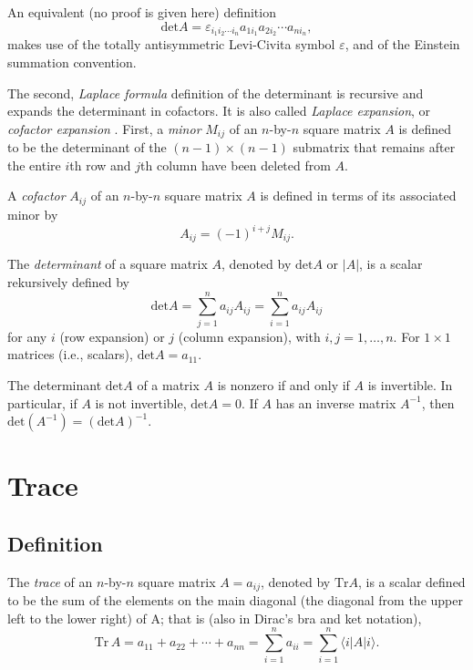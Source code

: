 An equivalent (no proof is given here) definition
\begin{equation}
\textrm{det}A
=\varepsilon_{i_1 i_2\cdots i_n} a_{1i_1}a_{2i_2} \cdots a_{ni_n},
\end{equation}
makes use of the  totally antisymmetric Levi-Civita symbol $\varepsilon$,
 and  of the
 Einstein summation convention.


The second,
{\em Laplace formula}
definition of the determinant
is recursive and expands the determinant in cofactors.
It is also called
{\em Laplace expansion},
or
{\em cofactor expansion}
.
First,
a {\em minor}
$M_{ij}$ of an  $n$-by-$n$ square matrix  $A$ is
defined to be the determinant of the
$(n-1)\times (n-1)$ submatrix
that remains after the entire $i$th row and $j$th column have been deleted from $A$.

A {\em cofactor}
$A_{ij}$
of an $n$-by-$n$ square matrix  $A$
is defined in terms of its associated minor by
\begin{equation}
A_{ij}=(-1)^{i+j}M_{ij}.
\end{equation}

The {\em determinant} of a square matrix $A$, denoted by
$\textrm{det} A$ or $\vert A\vert$, is a scalar rekursively defined by
\begin{equation}
\textrm{det}A
=\sum_{j=1}^n a_{ij}A_{ij}
=\sum_{i=1}^n a_{ij}A_{ij}
\end{equation}
for any $i$ (row expansion) or $j$ (column expansion), with $i,j=1,\ldots ,n$.
For $1\times 1$ matrices (i.e., scalars), $\textrm{det}A =a_{11}$.


The determinant $\textrm{det}A $ of a matrix $A$ is nonzero if and only if $A$ is invertible.
In particular, if $A$ is not invertible, $\textrm{det}A =0$.
If $A$ has an inverse matrix $A^{-1}$, then $\textrm{det}(A^{-1}) = (\textrm{det}A)^{-1} $.




\section{Trace}
\label{2013-ch-fdvs-trace}

\subsection{Definition}
The {\em trace} of an $n$-by-$n$ square matrix $A=a_{ij}$, denoted by
$\textrm{Tr} A$,  is a scalar
defined to be the sum of the elements on the main diagonal
 (the diagonal from the upper left to the lower right) of A; that is  (also in Dirac's bra and ket notation),
\begin{equation}
\textrm{Tr}\,A
= a_{11} +a_{22}+ \cdots +a_{nn}
=\sum_{i=1}^n a_{ii}=\sum_{i=1}^n \langle i \vert A\vert i \rangle.
\end{equation}

